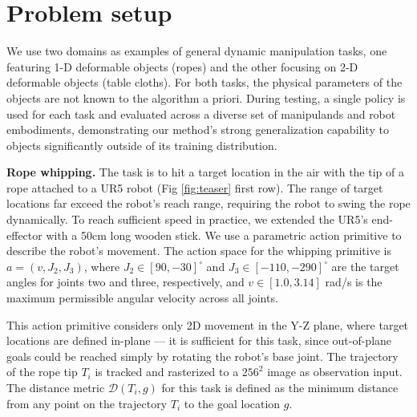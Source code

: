\section{Problem setup}
\label{sec:setup}
We use two domains as examples of general dynamic manipulation tasks, one featuring 1-D deformable objects (ropes) and the other focusing on 2-D deformable objects (table cloths). For both tasks, the physical parameters of the objects are not known to the algorithm a priori.
During testing, a single policy is used for each task and evaluated across a diverse set of manipulands and robot embodiments, demonstrating our method's strong generalization capability to objects significantly outside of its training distribution.

\textbf{Rope whipping.}
The task is to hit a target location in the air with the tip of a rope attached to a UR5 robot (Fig \ref{fig:teaser} first row). The range of target locations far exceed the robot's reach range, requiring the robot to swing the rope dynamically. To reach sufficient speed in practice, we extended the UR5's end-effector with a 50cm long wooden stick. We use a parametric action primitive to describe the robot's movement. The action space for the whipping primitive is $a = (v, J_2, J_3)$, where $J_2 \in [90,-30]^{\circ}$ and $J_3 \in [-110,-290]^{\circ}$ are the target angles for joints two and three, respectively, and $v \in [1.0,3.14]$ \si{rad/s} is the maximum permissible angular velocity across all joints. 



This action primitive considers only 2D movement in the Y-Z plane, where target locations are defined in-plane --- it is sufficient for this task, since out-of-plane goals could be reached simply by rotating the robot's base joint. 
The trajectory of the rope tip $T_i$ is tracked and rasterized to a $256^2$ image as observation input.
The distance metric $\mathcal{D}(T_i,g)$ for this task is defined as the minimum distance from any point on the trajectory $T_i$ to the goal location $g$.


